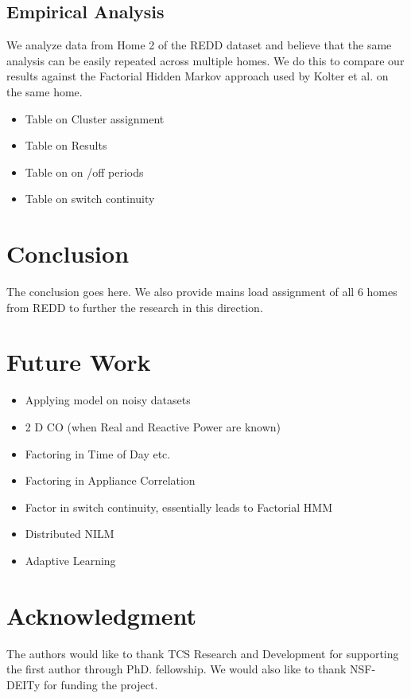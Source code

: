\documentclass[conference]{IEEEtran}
\begin{document}
\subsection{Empirical Analysis}
We analyze data from Home 2 of the REDD dataset and believe that the same analysis can be easily repeated across multiple homes. We do this to compare our results against the Factorial Hidden Markov approach used by Kolter et al. \cite{redd} on the same home.

\begin{itemize}
\item Table on Cluster assignment
\item Table on Results
\item Table on on /off periods
\item Table on switch continuity
\end{itemize}



\section{Conclusion}
The conclusion goes here.
We also provide mains load assignment of all 6 homes from REDD to further the research in this direction.

\section{Future Work}
\begin{itemize}

\item Applying model on noisy datasets
\item 2 D CO (when Real and Reactive Power are known)
\item Factoring in Time of Day etc.
\item Factoring in Appliance Correlation
\item Factor in switch continuity, essentially leads to Factorial HMM
\item Distributed NILM
\item Adaptive Learning
\end{itemize}

\section*{Acknowledgment}
The authors would like to thank TCS Research and Development for supporting the first author through PhD. fellowship. We would also like to thank NSF- DEITy for funding the project.


\end{document}

